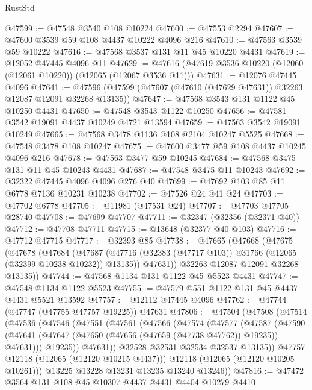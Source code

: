 \begin{lexlean}{RustStd}
\begin{coremodule}
@47599 := @47548 @3540 @108 @10224
@47600 := @47553 @2294
@47607 := @47600 @3539 @59 @108 @4437 @10222 @4096 @216
@47610 := @47563 @3539 @59 @10222
@47616 := @47568 @3537 @131 @11 @45 @10220 @4431
@47619 := @12052 @47445 @4096 @11
@47629 := @47616 (@47619 @3536 @10220 (@12060 (@12061 @10220)) (@12065 (@12067 @3536 @11)))
@47631 := @12076 @47445 @4096
@47641 := @47596 (@47599 (@47607 (@47610 (@47629 @47631)) @32263 @12087 @12091 @32268 @13135))
@47647 := @47568 @3543 @131 @1122 @45 @10250 @4431
@47650 := @47548 @3543 @1122 @10250
@47656 := @47581 @3542 @19091 @4437 @10249 @4721 @13594
@47659 := @47563 @3542 @19091 @10249
@47665 := @47568 @3478 @1136 @108 @2104 @10247 @5525
@47668 := @47548 @3478 @108 @10247
@47675 := @47600 @3477 @59 @108 @4437 @10245 @4096 @216
@47678 := @47563 @3477 @59 @10245
@47684 := @47568 @3475 @131 @11 @45 @10243 @4431
@47687 := @47548 @3475 @11 @10243
@47692 := @32322 @47445 @4096 @4096 @276 @40
@47699 := @47692 @103 @85 @11 @6778 @7136 @10231 @10238
@47702 := @47526 @24 @41 @24
@47703 := @47702 @6778
@47705 := @11981 (@47531 @24)
@47707 := @47703 @47705 @28740
@47708 := @47699 @47707
@47711 := @32347 (@32356 (@32371 @40))
@47712 := @47708 @47711
@47715 := @13648 (@32377 @40 @103)
@47716 := @47712 @47715
@47717 := @32393 @85
@47738 := @47665
    (@47668
      (@47675
        (@47678
          (@47684
            (@47687 (@47716 (@32383 (@47717 @103)) @31766 (@12065 (@32399 @10238 @10232)) @13135))
            @47631))
        @32263
        @12087
        @12091
        @32268
        @13135))
@47744 := @47568 @1134 @131 @1122 @45 @5523 @4431
@47747 := @47548 @1134 @1122 @5523
@47755 := @47579 @551 @1122 @131 @45 @4437 @4431 @5521 @13592
@47757 := @12112 @47445 @4096
@47762 := @47744 (@47747 (@47755 @47757 @19225)) @47631
@47806 := @47504
    (@47508
      (@47514
        (@47536
          (@47546
            (@47551
              (@47561
                (@47566
                  (@47574
                    (@47577
                      (@47587
                        (@47590
                          (@47641
                            (@47647 (@47650 (@47656 (@47659 (@47738 @47762)) @19235)) @47631)))
                        @19235))
                    @47631))
                @32528
                @32531
                @32534
                @32537
                @13135))
            @47757
            @12118
            (@12065 (@12120 @10215 @4437)))
          @12118
          (@12065 (@12120 @10205 @10261)))
        @13225
        @13228
        @13231
        @13235
        @13240
        @13246))
@47816 := @47472 @3564 @131 @108 @45 @10307 @4437 @4431 @4404 @10279 @4410

\end{coremodule}
\end{lexlean}
